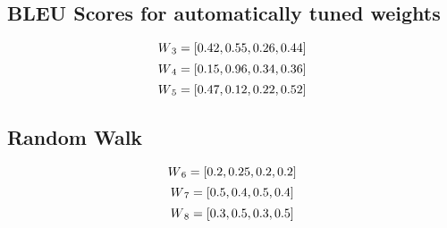 \documentclass[11pt,letterpaper]{article}
\begin{document}


\subsection{BLEU Scores for automatically tuned weights}

\begin{displaymath}
W\textsubscript{3} = [0.42, 0.55, 0.26, 0.44]
\end{displaymath}
\begin{displaymath}
W\textsubscript{4} = [0.15,  0.96,  0.34,  0.36]
\end{displaymath}
\begin{displaymath}
W\textsubscript{5} = [0.47,  0.12,  0.22,  0.52]
\end{displaymath}




\subsection{Random Walk}

\begin{displaymath}
W\textsubscript{6} = [0.2, 0.25, 0.2, 0.2]
\end{displaymath}
\begin{displaymath}
W\textsubscript{7} = [0.5,  0.4,  0.5,  0.4]
\end{displaymath}
\begin{displaymath}
W\textsubscript{8} = [0.3,  0.5,  0.3,  0.5]
\end{displaymath}
\end{document}
